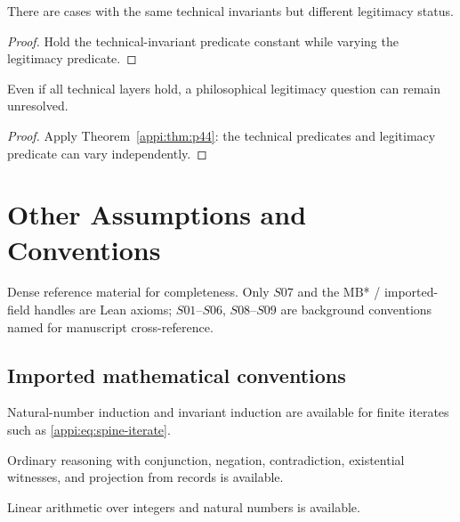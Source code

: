 \begin{theorem}
\label{appi:thm:p44}
There are cases with the same technical invariants but different legitimacy status.
\end{theorem}
\begin{proof}
Hold the technical-invariant predicate constant while varying the legitimacy predicate.
\end{proof}

\begin{corollary}
\label{appi:cor:p45}
Even if all technical layers hold, a philosophical legitimacy question can remain unresolved.
\end{corollary}
\begin{proof}
Apply Theorem~\ref{appi:thm:p44}: the technical predicates and legitimacy predicate can vary independently.
\end{proof}

\section{Other Assumptions and Conventions}
\label{sec:appi-other-assumptions}

Dense reference material for completeness.
Only \(S07\) and the \(\text{MB}\)* / imported-field handles are Lean axioms; \(S01\)--\(S06\), \(S08\)--\(S09\) are background conventions named for manuscript cross-reference.

\subsection{Imported mathematical conventions}

\begin{assumption}[S01: induction]
\label{appi:ass:s01}
Natural-number induction and invariant induction are available for finite iterates such as \eqref{appi:eq:spine-iterate}.
\end{assumption}

\begin{assumption}
\label{appi:ass:s02}
Ordinary reasoning with conjunction, negation, contradiction, existential witnesses, and projection from records is available.
\end{assumption}

\begin{assumption}
\label{appi:ass:s03}
Linear arithmetic over integers and natural numbers is available.
\end{assumption}

